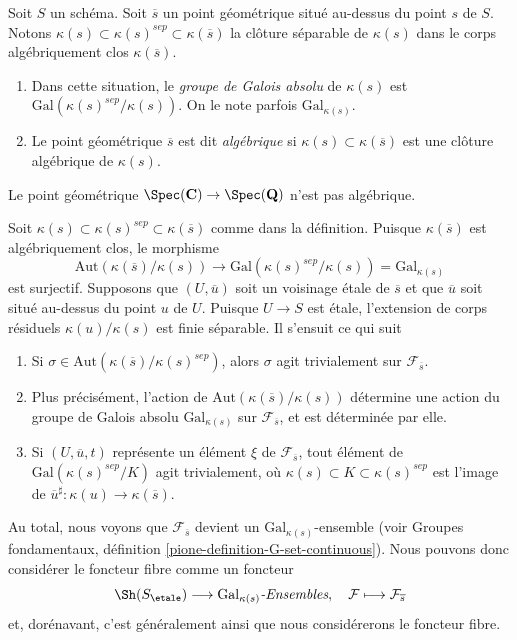 \begin{definition}
\label{definition-algebraic-geometric-point}
Soit $S$ un sch\'ema.
Soit $\overline{s}$ un point g\'eom\'etrique situ\'e au-dessus du point $s$ de $S$.
Notons $\kappa(s) \subset \kappa(s)^{sep} \subset \kappa(\overline{s})$
la cl\^oture s\'eparable de $\kappa(s)$ dans le corps alg\'ebriquement
clos $\kappa(\overline{s})$.
\begin{enumerate}
\item Dans cette situation, le {\it groupe de Galois absolu} de $\kappa(s)$
est $\text{Gal}(\kappa(s)^{sep}/\kappa(s))$. On le note parfois
$\text{Gal}_{\kappa(s)}$.
\item Le point g\'eom\'etrique $\overline{s}$ est dit
{\it alg\'ebrique} si $\kappa(s) \subset \kappa(\overline{s})$ est
une cl\^oture alg\'ebrique de $\kappa(s)$.
\end{enumerate}
\end{definition}

\begin{example}
\label{example-stupid}
Le point g\'eom\'etrique
$\Spec(\mathbf{C}) \to \Spec(\mathbf{Q})$
n'est pas alg\'ebrique.
\end{example}

\noindent
Soit $\kappa(s) \subset \kappa(s)^{sep} \subset \kappa(\overline{s})$
comme dans la d\'efinition. Puisque $\kappa(\overline{s})$ est alg\'ebriquement
clos, le morphisme
$$
\text{Aut}(\kappa(\overline{s})/\kappa(s))
\longrightarrow
\text{Gal}(\kappa(s)^{sep}/\kappa(s)) = \text{Gal}_{\kappa(s)}
$$
est surjectif. Supposons que $(U, \overline{u})$ soit un
voisinage \'etale de $\overline{s}$ et que $\overline{u}$ soit situ\'e au-dessus
du point $u$ de $U$. Puisque $U \to S$ est \'etale, l'extension de corps r\'esiduels
$\kappa(u)/\kappa(s)$ est finie s\'eparable.
Il s'ensuit ce qui suit
\begin{enumerate}
\item Si $\sigma \in \text{Aut}(\kappa(\overline{s})/\kappa(s)^{sep})$,
alors $\sigma$ agit trivialement sur $\mathcal{F}_{\overline{s}}$.
\item Plus pr\'ecis\'ement, l'action de
$\text{Aut}(\kappa(\overline{s})/\kappa(s))$
d\'etermine une action du groupe de Galois absolu
$\text{Gal}_{\kappa(s)}$ sur $\mathcal{F}_{\overline{s}}$, et est d\'etermin\'ee par elle.
\item Si $(U, \overline{u}, t)$ repr\'esente un \'el\'ement $\xi$ de
$\mathcal{F}_{\overline{s}}$, tout \'el\'ement de
$\text{Gal}(\kappa(s)^{sep}/K)$ agit trivialement, o\`u
$\kappa(s) \subset K \subset \kappa(s)^{sep}$ est l'image de
$\overline{u}^\sharp : \kappa(u) \to \kappa(\overline{s})$.
\end{enumerate}
Au total, nous voyons que $\mathcal{F}_{\overline{s}}$ devient un
$\text{Gal}_{\kappa(s)}$-ensemble (voir
Groupes fondamentaux, d\'efinition \ref{pione-definition-G-set-continuous}).
Nous pouvons donc consid\'erer le foncteur fibre comme un foncteur
$$
\Sh(S_\etale) \longrightarrow
\text{Gal}_{\kappa(s)}\textit{-Ensembles},
\quad
\mathcal{F} \longmapsto \mathcal{F}_{\overline{s}}
$$
et, dor\'enavant, c'est g\'en\'eralement ainsi que nous consid\'ererons le foncteur fibre.


